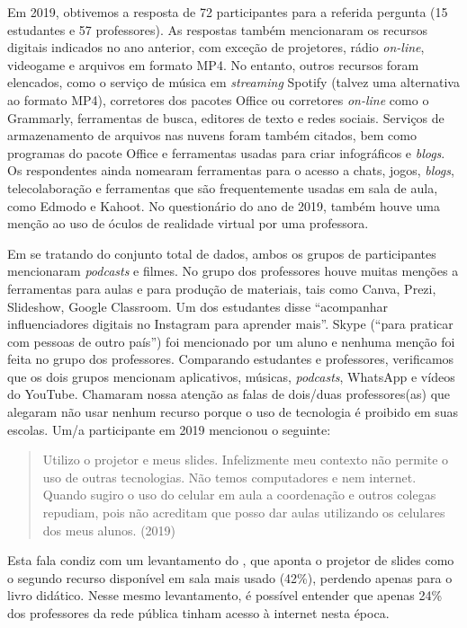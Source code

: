 \documentclass[portuguese]{textolivre}
\begin{document}
Em 2019, obtivemos a resposta de 72 participantes para a referida pergunta (15 estudantes e 57 professores). As respostas também mencionaram os recursos digitais indicados no ano anterior, com exceção de projetores, rádio \textit{on-line}, videogame e arquivos em formato MP4. No entanto, outros recursos foram elencados, como o serviço de música em \textit{streaming} Spotify (talvez uma alternativa ao formato MP4), corretores dos pacotes Office ou corretores \textit{on-line} como o Grammarly, ferramentas de busca, editores de texto e redes sociais. Serviços de armazenamento de arquivos nas nuvens foram também citados, bem como programas do pacote Office e ferramentas usadas para criar infográficos e \textit{blogs}. Os respondentes ainda nomearam ferramentas para o acesso a chats, jogos, \textit{blogs}, telecolaboração e ferramentas que são frequentemente usadas em sala de aula, como Edmodo e Kahoot. No questionário do ano de 2019, também houve uma menção ao uso de óculos de realidade virtual por uma professora.
	
Em se tratando do conjunto total de dados, ambos os grupos de participantes mencionaram \textit{podcasts} e filmes. No grupo dos professores houve muitas menções a ferramentas para aulas e para produção de materiais, tais como Canva, Prezi, Slideshow, Google Classroom.  Um dos estudantes disse “acompanhar influenciadores digitais no Instagram para aprender mais”. Skype (“para praticar com pessoas de outro país”) foi mencionado por um aluno e nenhuma menção foi feita no grupo dos professores. Comparando estudantes e professores, verificamos que os dois grupos mencionam aplicativos, músicas, \textit{podcasts}, WhatsApp e vídeos do YouTube. Chamaram nossa atenção as falas de dois/duas professores(as) que alegaram não usar nenhum recurso porque o uso de tecnologia é proibido em suas escolas. Um/a participante em 2019 mencionou o seguinte:

\begin{quote}
    Utilizo o projetor e meus slides. Infelizmente meu contexto não permite o uso de outras tecnologias. Não temos computadores e nem internet. Quando sugiro o uso do celular em aula a coordenação e outros colegas repudiam, pois não acreditam que posso dar aulas utilizando os celulares dos meus alunos. (2019)
\end{quote}

Esta fala condiz com um levantamento do \textcite{british_council_o_2015}, que aponta o projetor de slides como o segundo recurso disponível em sala mais usado (42\%), perdendo apenas para o livro didático. Nesse mesmo levantamento, é possível entender que apenas 24\% dos professores da rede pública tinham acesso à internet nesta época.
\end{document}
